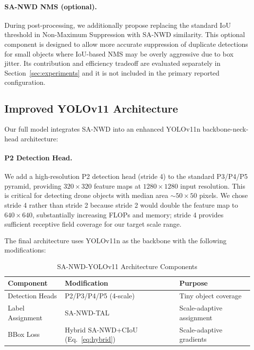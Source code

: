 \documentclass[journal]{IEEEtran}
\begin{document}
\paragraph{SA-NWD NMS (optional).} During post-processing, we additionally propose replacing the standard IoU threshold in Non-Maximum Suppression with SA-NWD similarity. This optional component is designed to allow more accurate suppression of duplicate detections for small objects where IoU-based NMS may be overly aggressive due to box jitter. Its contribution and efficiency tradeoff are evaluated separately in Section~\ref{sec:experiments} and it is not included in the primary reported configuration.

\subsection{Improved YOLOv11 Architecture}

Our full model integrates SA-NWD into an enhanced YOLOv11n backbone-neck-head architecture:

\paragraph{P2 Detection Head.} We add a high-resolution P2 detection head (stride 4) to the standard P3/P4/P5 pyramid, providing $320\times320$ feature maps at $1280\times1280$ input resolution. This is critical for detecting drone objects with median area $\sim 50\times50$ pixels. We chose stride 4 rather than stride 2 because stride 2 would double the feature map to $640\times640$, substantially increasing FLOPs and memory; stride 4 provides sufficient receptive field coverage for our target scale range.

The final architecture uses YOLOv11n as the backbone with the following modifications:

\begin{table}[h]
\centering
\caption{SA-NWD-YOLOv11 Architecture Components}
\label{tab:architecture}
\begin{tabular}{lll}
\toprule
\textbf{Component} & \textbf{Modification} & \textbf{Purpose} \\
\midrule
Detection Heads & P2/P3/P4/P5 (4-scale) & Tiny object coverage \\
Label Assignment & SA-NWD-TAL & Scale-adaptive assignment \\
BBox Loss & Hybrid SA-NWD+CIoU (Eq.~\ref{eq:hybrid}) & Scale-adaptive gradients \\
\bottomrule
\end{tabular}
\end{table}
\end{document}
